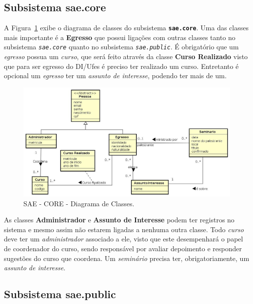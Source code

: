 \subsection{Subsistema sae.core}
\label{sec-requisitos-diagrama-de-classes-core}

A Figura~\ref{fig-requisitos-core-diagrama-classes} exibe o diagrama de classes do subsistema \textbf{\texttt{sae.core}}. Uma das classes mais importante é a \textbf{Egresso} que possui ligações com outras classes tanto no subsistema \textit{\texttt{sae.core}} quanto no subsistema \textit{\texttt{sae.public}}. É obrigatório que um \emph{egresso} possua um \emph{curso}, que será feito através da classe \textbf{Curso Realizado} visto que para ser egresso do DI/Ufes é preciso ter realizado um curso. Entretanto é opcional um \emph{egresso} ter um \emph{assunto de interesse}, podendo ter mais de um.

\begin{figure}[h]
	\centering
	\includegraphics[width=1\textwidth]{figuras/requisitos/diagrama-classe-core}
	\caption{SAE - CORE - Diagrama de Classes.}
	\label{fig-requisitos-core-diagrama-classes}
\end{figure}

As classes \textbf{Administrador} e \textbf{Assunto de Interesse} podem ter registros no sistema e mesmo assim não estarem ligadas a nenhuma outra classe. Todo \emph{curso} deve ter um \emph{administrador} associado a ele, visto que este desempenhará o papel de coordenador do curso, sendo responsável por avaliar depoimento e responder sugestões do curso que coordena. Um \emph{seminário} precisa ter, obrigatoriamente, um \emph{assunto de interesse}.



\subsection{Subsistema sae.public}
\label{sec-requisitos-diagrama-de-classes-public}

